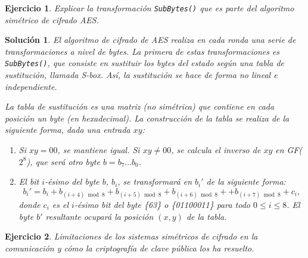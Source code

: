 \documentclass[
  a4paper,
  spanish,
  12pt,
]{scrartcl}
\theoremstyle{ejercicio-style}
\newtheorem{ejer}{Ejercicio}
\theoremstyle{remark-style}
\newtheorem*{sol}{Solución}
\begin{document}
\begin{ejer}
  Explicar la transformación \texttt{SubBytes()} que es parte del algoritmo simétrico de cifrado AES.
\end{ejer}

\begin{sol}
El algoritmo de cifrado de AES realiza en cada ronda una serie de transformaciones a nivel de bytes. La primera de estas transformaciones es \texttt{SubBytes()}, que consiste en sustituir los bytes del estado según una tabla de sustitución, llamada S-box. Así, la sustitución se hace de forma no lineal e independiente.

La tabla de sustitución es una matriz (no simétrica) que contiene en cada posición un byte (en hexadecimal). La construcción de la tabla se realiza de la siguiente forma, dada una entrada $xy$:

\begin{enumerate}
\item Si $xy = 00$, se mantiene igual. Si $xy \neq 00$, se calcula el inverso de $xy$ en GF($2^8$), que será otro byte $b = b_7\dots b_0$.
\item El bit $i$-ésimo del byte $b$, $b_i$, se transformará en $b_i'$ de la siguiente forma:
  \[b_i' = b_i + b_{(i+4)\bmod 8} + b_{(i+5)\bmod 8} + b_{(i+6)\bmod 8} + + b_{(i+7)\bmod 8} + c_i,
  \]
  donde $c_i$ es el $i$-ésimo bit del byte \{63\} o \{01100011\} para todo $0 \leq i \le 8$. El byte $b'$ resultante ocupará la posición $(x,y)$ de la tabla.


\end{enumerate}
\end{sol}

\begin{ejer}
  Limitaciones de los sistemas simétricos de cifrado en la comunicación y cómo la criptografía de clave pública los ha resuelto.
\end{ejer}
\end{document}
